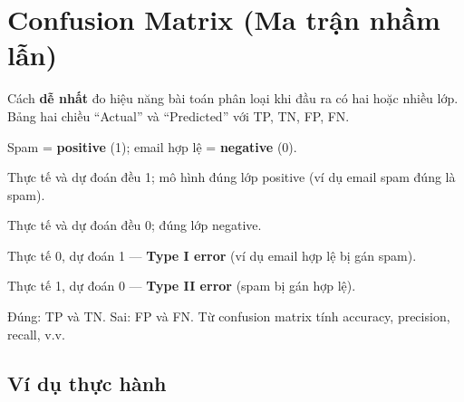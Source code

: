 \section{Confusion Matrix (Ma trận nhầm lẫn)}
\label{sec:confusion-matrix}

\begin{dinhnghia}[title={Confusion Matrix}]
Cách \textbf{dễ nhất} đo hiệu năng bài toán phân loại khi đầu ra có hai hoặc nhiều lớp.
Bảng hai chiều ``Actual'' và ``Predicted'' với TP, TN, FP, FN.
\end{dinhnghia}


\begin{vidu}[title={Ví dụ spam email}]
Spam = \textbf{positive} (1); email hợp lệ = \textbf{negative} (0).
\end{vidu}

\begin{tinhchat}[title={True Positive (TP)}]
Thực tế và dự đoán đều 1; mô hình đúng lớp positive (ví dụ email spam đúng là spam).
\end{tinhchat}

\begin{tinhchat}[title={True Negative (TN)}]
Thực tế và dự đoán đều 0; đúng lớp negative.
\end{tinhchat}

\begin{tinhchat}[title={False Positive (FP)}]
Thực tế 0, dự đoán 1 --- \textbf{Type I error} (ví dụ email hợp lệ bị gán spam).
\end{tinhchat}

\begin{tinhchat}[title={False Negative (FN)}]
Thực tế 1, dự đoán 0 --- \textbf{Type II error} (spam bị gán hợp lệ).
\end{tinhchat}

\begin{phuongphap}[title={Phân loại đúng / sai}]
Đúng: TP và TN. Sai: FP và FN.
Từ confusion matrix tính accuracy, precision, recall, v.v.
\end{phuongphap}

\subsection{Ví dụ thực hành}

